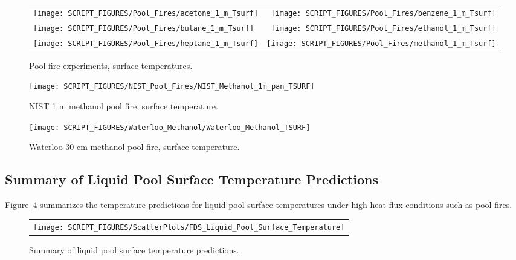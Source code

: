 \newpage

\begin{figure}[p]{}
\begin{tabular*}{\textwidth}{l@{\extracolsep{\fill}}r}
\texttt{[image: SCRIPT\_FIGURES/Pool\_Fires/acetone\_1\_m\_Tsurf]} &
\texttt{[image: SCRIPT\_FIGURES/Pool\_Fires/benzene\_1\_m\_Tsurf]} \\
\texttt{[image: SCRIPT\_FIGURES/Pool\_Fires/butane\_1\_m\_Tsurf]} &
\texttt{[image: SCRIPT\_FIGURES/Pool\_Fires/ethanol\_1\_m\_Tsurf]} \\
\texttt{[image: SCRIPT\_FIGURES/Pool\_Fires/heptane\_1\_m\_Tsurf]} &
\texttt{[image: SCRIPT\_FIGURES/Pool\_Fires/methanol\_1\_m\_Tsurf]}
\end{tabular*}
\caption[Pool fire experiments, surface temperatures]{Pool fire experiments, surface temperatures.}
\label{Pool_Fire_Surf_Temp}
\end{figure}

\begin{figure}[!h]
\centering
\texttt{[image: SCRIPT\_FIGURES/NIST\_Pool\_Fires/NIST\_Methanol\_1m\_pan\_TSURF]}
\caption[NIST 1 m methanol pool fire, surface temperature]{NIST 1 m methanol pool fire, surface temperature.}
\label{NIST_Methanol_1m_pan_TSURF}
\end{figure}

\begin{figure}[!h]
\centering
\texttt{[image: SCRIPT\_FIGURES/Waterloo\_Methanol/Waterloo\_Methanol\_TSURF]}
\caption[Waterloo 30 cm methanol pool fire, surface temperature]{Waterloo 30 cm methanol pool fire, surface temperature.}
\label{Waterloo_Methanol_TSURF}
\end{figure}



\clearpage

\subsection{Summary of Liquid Pool Surface Temperature Predictions}
\label{Liquid Pool Surface Temperature}

Figure~\ref{Summary_Liquid_Pool_Surface_Temperature} summarizes the temperature predictions for liquid pool surface temperatures under high heat flux conditions such as pool fires.

\begin{figure}[h!]
\begin{center}
\begin{tabular}{c}
\texttt{[image: SCRIPT\_FIGURES/ScatterPlots/FDS\_Liquid\_Pool\_Surface\_Temperature]}
\end{tabular}
\end{center}
\caption[Summary of liquid pool surface temperature predictions]
{Summary of liquid pool surface temperature predictions.}
\label{Summary_Liquid_Pool_Surface_Temperature}
\end{figure}









